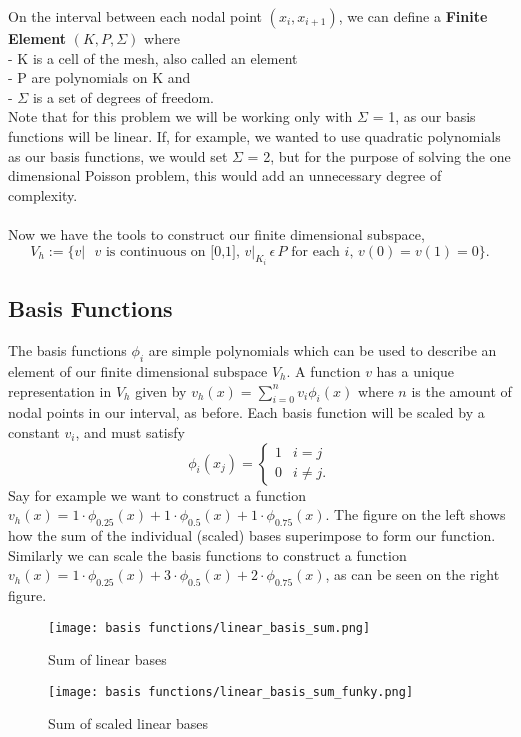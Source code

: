\documentclass{article}
\begin{document}
On the interval between each nodal point $(x_i, x_{i+1})$, we can define a \textbf{Finite Element} $(K, P, \Sigma)$  where \\
- K is a cell of the mesh, also called an element \\
- P are polynomials on K and \\
- $\Sigma$ is a set of degrees of freedom. \\
Note that for this problem we will be working only with $\Sigma$ = 1, as our basis functions will be linear. If, for example, we wanted to use quadratic polynomials as our basis functions, we would set $\Sigma$ = 2, but for the purpose of solving the one dimensional Poisson problem, this would add an unnecessary degree of complexity. \\
\\
Now we have the tools to construct our finite dimensional subspace,
$$ V_h := \{v| \textrm{ $v$ is continuous on [0,1], } v|_{K_i}\, \epsilon\, P \textrm{ for each } i,\,  v(0) = v(1) = 0 \}. $$

\subsection{Basis Functions}
  The basis functions $\phi_i$ are simple polynomials which can be used to describe an element of our finite dimensional subspace $V_h$. A function $v$ has a unique representation in $V_h$ given by 
 $v_h(x) = \sum_{i=0}^{n}v_i\phi_i(x)$ where $n$ is the amount of nodal points in our interval, as before. Each basis function will be scaled by a constant $v_i$, and must satisfy $$\phi_i(x_j) =  \begin{cases} 
      1 & i = j \\
      0 & i \neq j.
   \end{cases}$$
Say for example we want to construct a function $v_h(x) = 1\cdot \phi_{0.25}(x) + 1\cdot \phi_{0.5}(x) + 1\cdot \phi_{0.75}(x)$. The figure on the left shows how the sum of the individual (scaled) bases superimpose to form our function. 
Similarly we can scale the basis functions to construct a function $v_h(x) = 1\cdot \phi_{0.25}(x) + 3\cdot \phi_{0.5}(x) + 2\cdot \phi_{0.75}(x)$, as can be seen on the right figure.
\begin{figure}[hbt!]
\centering
\begin{minipage}{.5\textwidth}
    \centering
    \texttt{[image: basis functions/linear\_basis\_sum.png]}
    \caption{Sum of linear bases}
    \label{fig:Sum of linear bases}

\end{minipage}%
\begin{minipage}{.5\textwidth}
    \centering
    \texttt{[image: basis functions/linear\_basis\_sum\_funky.png]}
    \caption{Sum of scaled linear bases}
    \label{fig:Sum of linear bases}

\end{minipage}
\end{figure}
\end{document}
